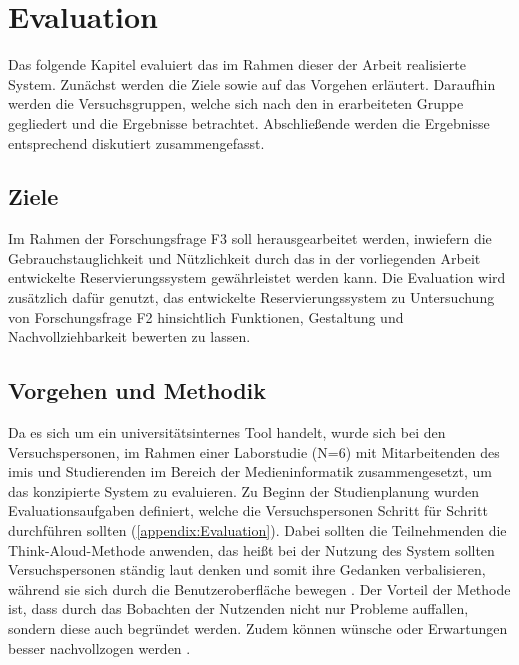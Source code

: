 

\chapter{Evaluation}
\label{chapter-evaluation}
Das folgende Kapitel evaluiert das im Rahmen dieser der Arbeit realisierte System. Zunächst werden
die Ziele sowie auf das Vorgehen erläutert. Daraufhin werden die Versuchsgruppen, welche sich nach
den in  erarbeiteten Gruppe gegliedert und die Ergebnisse betrachtet.
Abschließende werden die Ergebnisse entsprechend diskutiert zusammengefasst.

\section{Ziele}
Im Rahmen der Forschungsfrage F3 soll herausgearbeitet werden, inwiefern die Gebrauchstauglichkeit
und Nützlichkeit durch das in der vorliegenden Arbeit entwickelte Reservierungssystem gewährleistet
werden kann. Die Evaluation wird zusätzlich dafür genutzt, das entwickelte Reservierungssystem zu
Untersuchung von Forschungsfrage F2 hinsichtlich Funktionen, Gestaltung und Nachvollziehbarkeit
bewerten zu lassen.


\section{Vorgehen und Methodik}
Da es sich um ein universitätsinternes Tool handelt, wurde sich bei den Versuchspersonen, im Rahmen
einer Laborstudie (N=6) mit Mitarbeitenden des \ac{imis} und Studierenden im Bereich der
Medieninformatik zusammengesetzt, um das konzipierte System zu evaluieren. Zu Beginn der
Studienplanung wurden Evaluationsaufgaben definiert, welche die Versuchspersonen Schritt für Schritt
durchführen sollten (\ref{appendix:Evaluation}). Dabei sollten die Teilnehmenden die
Think-Aloud-Methode anwenden, das heißt bei der Nutzung des System sollten Versuchspersonen ständig
laut denken und somit ihre Gedanken verbalisieren, während sie sich durch die Benutzeroberfläche
bewegen \cite{nielsen_usability_1994}. Der Vorteil der Methode ist, dass durch das Bobachten der
Nutzenden nicht nur Probleme auffallen, sondern diese auch begründet werden. Zudem können wünsche
oder Erwartungen besser nachvollzogen werden \cite{nielsen_think}.

